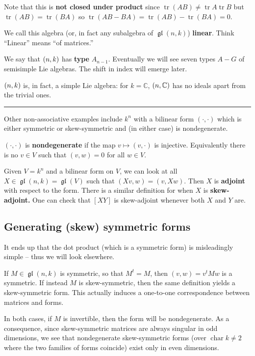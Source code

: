 \documentclass[12pt]{article}
\theoremstyle{nonumberbreak}
\theoremstyle{changebreak}
\theoremstyle{nonumberbreak}
\theoremstyle{change}
\newcommand*{\C}{
\mathbb{C}
}
\newcommand*{\brk}{
\rule{2in}{.1pt}
}
\DeclareMathOperator{\ch}{char}
\DeclareMathOperator{\gl}{\mathfrak{gl}}
\let\sl\relax
\DeclareMathOperator{\sl}{\mathfrak{sl}}
\DeclareMathOperator{\tr}{tr}
\begin{document}
Note that this is \textbf{not closed under product} since $\tr(AB)\ne\tr A\tr B$ but $\tr(AB)=\tr(BA)$
so $\tr(AB-BA)=\tr(AB)-\tr(BA)=0$.
\begin{defn}
	We call this algebra (or, in fact any subalgebra of $\gl(n,k)$) \textbf{linear}. Think 
	``Linear'' means ``of matrices.''
\end{defn}

We say that $\sl(n,k)$ has \textbf{type} $A_{n-1}$. Eventually we will see seven types
$A-G$ of semisimple Lie algebras. The shift in index will emerge later.

$\sl(n,k)$ is, in fact, a simple Lie algebra: for $k=\C$, $\sl(n,\C)$ has no ideals
apart from the trivial ones. 

\brk

Other non-associative examples include $k^n$ with a bilinear form $(\cdot,\cdot)$ which
is either symmetric or skew-symmetric and (in either case) is nondegenerate.
\begin{defn}
	$(\cdot,\cdot)$ is \textbf{nondegenerate} if the map $v\mapsto (v,\cdot)$ is injective. Equivalently
	there is no $v\in V$ such that $(v,w)=0$ for all $w\in V$.
\end{defn}

Given $V=k^n$ and a bilinear form on $V$, we can look at all $X\in \gl(n,k)=\gl(V)$ such that 
$(Xv,w)=(v,Xw)$. Then $X$ is \textbf{adjoint} with respect to the form. There is a similar definition for when
$X$ is \textbf{skew-adjoint.} One can check that 
$[XY]$ is skew-adjoint whenever both $X$ and $Y$ are.

\subsection{Generating (skew) symmetric forms}
It ends up that the dot product (which is a symmetric form) is misleadingly simple -- thus
we will look elsewhere.

If $M\in \gl(n,k)$ is symmetric, so that $M^t=M$, then $(v,w)=v^tMw$ is a symmetric. If 
instead $M$ is skew-symmetric, then the same definition yields a skew-symmetric form. 
This actually induces a one-to-one correspondence between matrices and forms.

In both cases, if $M$ is invertible, then the form will be nondegenerate. As a consequence, 
since skew-symmetric matrices are always singular in odd dimensions, we see that 
nondegenerate skew-symmetric forms (over $\ch k\ne 2$ where the two families of forms
coincide) exist only in even dimensions.
\end{document}

